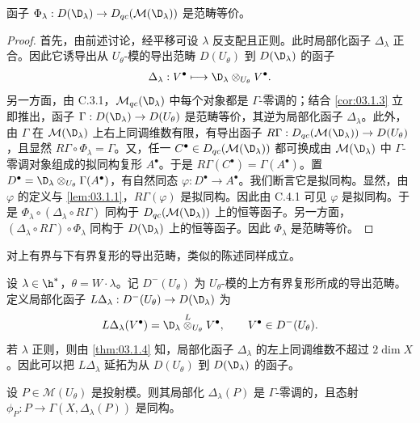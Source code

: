 \begin{theorem}\label{thm:03.1.6}
函子 $\Phi_\lambda:D(\D_\lambda)\to D_{qc}(\mathcal{M}(\D_\lambda))$ 是范畴等价。
\end{theorem}

\begin{proof}
首先，由前述讨论，经平移可设 $\lambda$ 反支配且正则。此时局部化函子 $\Delta_\lambda$ 正合。因此它诱导出从 $U_\theta$-模的导出范畴 $D(U_\theta)$ 到 $D(\D_\lambda)$ 的函子
$$\Delta_\lambda:V^\bullet\longmapsto\D_\lambda\otimes_{U_\theta}V^\bullet.$$
另一方面，由 C.3.1，$\mathcal{M}_{qc}(\D_\lambda)$ 中每个对象都是 $\Gamma$-零调的；结合 \ref{cor:03.1.3} 立即推出，函子 $\Gamma:D(\D_\lambda)\to D(U_\theta)$ 是范畴等价，其逆为局部化函子 $\Delta_\lambda$。此外，由 $\Gamma$ 在 $\mathcal{M}(\D_\lambda)$ 上右上同调维数有限，有导出函子 $R\Gamma:D_{qc}(\mathcal{M}(\D_\lambda))\to D(U_\theta)$，且显然 $R\Gamma\circ\Phi_\lambda=\Gamma$。又，任一 $C^\bullet\in D_{qc}(\mathcal{M}(\D_\lambda))$ 都可换成由 $\mathcal{M}(\D_\lambda)$ 中 $\Gamma$-零调对象组成的拟同构复形 $A^\bullet$。于是 $R\Gamma(C^\bullet)=\Gamma(A^\bullet)$。置 $D^\bullet=\D_\lambda\otimes_{U_\theta}\Gamma(A^\bullet)$，有自然同态 $\varphi:D^\bullet\to A^\bullet$。我们断言它是拟同构。显然，由 $\varphi$ 的定义与 \ref{lem:03.1.1}，$R\Gamma(\varphi)$ 是拟同构。因此由 C.4.1 可见 $\varphi$ 是拟同构。于是 $\Phi_\lambda\circ(\Delta_\lambda\circ R\Gamma)$ 同构于 $D_{qc}(\mathcal{M}(\D_\lambda))$ 上的恒等函子。另一方面，$(\Delta_\lambda\circ R\Gamma)\circ\Phi_\lambda$ 同构于 $D(\D_\lambda)$ 上的恒等函子。因此 $\Phi_\lambda$ 是范畴等价。
\end{proof}

对上有界与下有界复形的导出范畴，类似的陈述同样成立。

设 $\lambda\in\h^*$，$\theta=W\cdot\lambda$。记 $D^-(U_\theta)$ 为 $U_\theta$-模的上方有界复形所成的导出范畴。定义局部化函子 $L\Delta_\lambda:D^-(U_\theta)\to D(\D_\lambda)$ 为
$$L\Delta_\lambda(V^\bullet)=\D_\lambda\overset{L}{\otimes}_{U_\theta}V^\bullet,\qquad V^\bullet\in D^-(U_\theta).$$
若 $\lambda$ 正则，则由 \ref{thm:03.1.4} 知，局部化函子 $\Delta_\lambda$ 的左上同调维数不超过 $2\dim X$。因此可以把 $L\Delta_\lambda$ 延拓为从 $D(U_\theta)$ 到 $D(\D_\lambda)$ 的函子。

\begin{lemma}\label{lem:03.1.7}
设 $P\in\mathcal{M}(U_\theta)$ 是投射模。则其局部化 $\Delta_\lambda(P)$ 是 $\Gamma$-零调的，且态射 $\phi_P:P\to\Gamma(X,\Delta_\lambda(P))$ 是同构。
\end{lemma}

